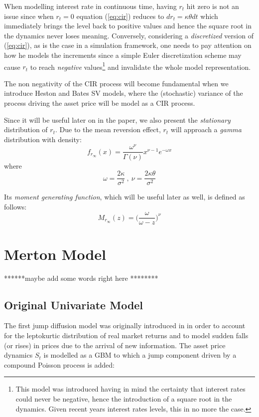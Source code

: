 When modelling interest rate in continuous time, having $r_t$ hit zero is not an issue since when $r_t=0$ equation (\ref{eq:cir}) reduces to $dr_t = \kappa\theta dt$ which immediately brings the level back to positive values and hence the square root in the dynamics never loses meaning. Conversely, considering a \textit{discretized} version of (\ref{eq:cir}), as is the case in a simulation framework, one needs to pay attention on how he models the increments since a simple Euler discretization scheme may cause $r_t$ to reach \textit{negative} values\footnote{This model was introduced having in mind the certainty that interest rates could never be negative, hence the introduction of a square root in the dynamics. Given recent years interest rates levels, this in no more the case.} and invalidate the whole model representation.

The non negativity of the CIR process will become fundamental when we introduce Heston and Bates SV models, where the (stochastic) variance of the process driving the asset price will be model as a CIR process.

Since it will be useful later on in the paper, we also present the \textit{stationary} distribution of $r_t$. Due to the mean reversion effect, $r_t$ will approach a \textit{gamma} distribution with density:
\begin{equation}
\label{eq:cir_pdf}
f_{r_\infty}(x) = \frac{\omega^\nu}{\Gamma(\nu)} x^{\nu-1}e^{-\omega x}
\end{equation}
where
\begin{equation*}
\omega= \frac{2\kappa}{\sigma^2}\: , \: \nu= \frac{2\kappa\theta}{\sigma^2}
\end{equation*}

Its \textit{moment generating function}, which will be useful later as well, is defined as follows:
\begin{equation}
\label{eq:cir_mgf}
	M_{r_\infty}(z) = \Big(\frac{\omega}{\omega-z}\Big)^\nu
\end{equation}


\bigskip
\section{Merton Model}

 ******maybe add some words right here ********
\subsection{Original Univariate Model}
The first jump diffusion model was originally introduced in \cite{MERTON1976} in order to account for the leptokurtic distribution of real market returns and to model sudden falls (or rises) in prices due to the arrival of new information.
The asset price dynamics $S_t$ is modelled as a GBM to which a jump component driven by a compound Poisson process is added:

